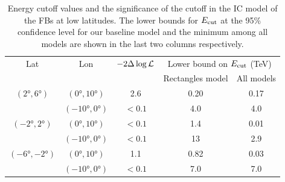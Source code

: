 %

\begin{table}
  \begin{center}
    \caption{Energy cutoff values and the significance of the cutoff in the IC model of the FBs at low latitudes.
The lower bounds for $E_{\text{cut}}$ at the 95\% confidence level for our baseline model and the minimum among all
models are shown in the last two columns respectively.
}
    \label{tab:IC}
    \begin{tabular}{|c|c|c|c|c|} %
     	\hline
		 Lat & Lon  & $-2 \Delta \log {\mathcal{L}}$ & \multicolumn{2}{c|}{Lower bound on $E_{\text{cut}}$ (TeV) } \\ 
		       &        &                                  &  \multicolumn{1}{c}{Rectangles model} & All models \\ 
		\hline
  		$(\ang{2}, \ang{6})$ & $(\ang{0}, \ang{10})$ & 2.6  & {0.20} & {0.17}\\ 
		& $(\ang{-10}, \ang{0})$ & $ < 0.1$  & 4.0  & 4.0 \\ 
 		\hline
  		$(\ang{-2}, \ang{2})$ & $(\ang{0}, \ang{10})$ & $ < 0.1$ & {1.4} & 0.01 \\ 
		& $(\ang{-10}, \ang{0})$ & $ < 0.1$ & 13  & 2.9  \\ 
 		\hline
  		$(\ang{-6}, \ang{-2})$ & $(\ang{0}, \ang{10})$ & 1.1 & {0.82} & 0.03 \\ 
		& $(\ang{-10}, \ang{0})$& $ < 0.1$ & {7.0} & {7.0} \\ 
 \hline
    \end{tabular}
  \end{center}
\end{table}




